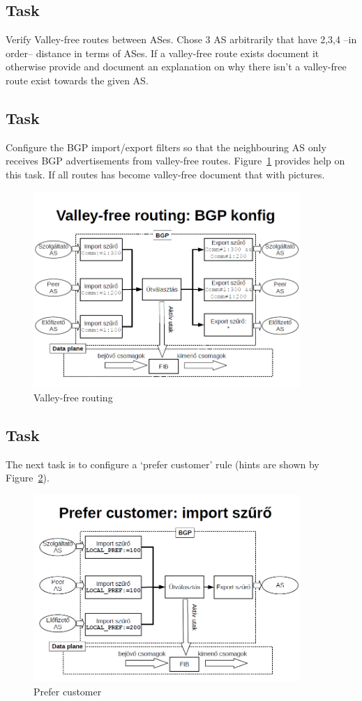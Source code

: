 \documentclass[a4paper]{article}
\begin{document}
\subsection{Task}
Verify Valley-free routes between ASes. Chose 3 AS arbitrarily that have 2,3,4 --in order-- distance in terms of ASes. If a valley-free route exists document it otherwise provide and document an explanation on why there isn't a valley-free route exist towards the given AS.
\subsection{Task}
Configure the BGP import/export filters so that the neighbouring AS only receives BGP advertisements from valley-free routes. Figure~\ref{fig:valley-free} provides help on this task. If all routes has become valley-free document that with pictures.

\begin{figure}[H]
    \centering
    \includegraphics[width=0.9\textwidth]{figures/valley.PNG}
    \caption{Valley-free routing}
    \label{fig:valley-free}
\end{figure}

\subsection{Task}
The next task is to configure a `prefer customer' rule (hints are shown by Figure~\ref{fig:prefer-customer}).
\begin{figure}[H]
    \centering
    \includegraphics[width=0.9\textwidth]{figures/prefer.png}
    \caption{Prefer customer}
    \label{fig:prefer-customer}
\end{figure}
\end{document}
